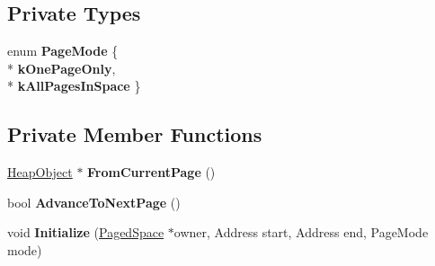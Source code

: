 \subsection*{Private Types}
\begin{DoxyCompactItemize}
\item 
enum {\bfseries Page\+Mode} \{ \\*
{\bfseries k\+One\+Page\+Only}, 
\\*
{\bfseries k\+All\+Pages\+In\+Space}
 \}\hypertarget{classv8_1_1internal_1_1_heap_object_iterator_a4c6710a31770d1d3b01ef1faaac5e553}{}\label{classv8_1_1internal_1_1_heap_object_iterator_a4c6710a31770d1d3b01ef1faaac5e553}

\end{DoxyCompactItemize}
\subsection*{Private Member Functions}
\begin{DoxyCompactItemize}
\item 
\hyperlink{classv8_1_1internal_1_1_heap_object}{Heap\+Object} $\ast$ {\bfseries From\+Current\+Page} ()\hypertarget{classv8_1_1internal_1_1_heap_object_iterator_a3327636c673b36f2c09bec975f61a9d4}{}\label{classv8_1_1internal_1_1_heap_object_iterator_a3327636c673b36f2c09bec975f61a9d4}

\item 
bool {\bfseries Advance\+To\+Next\+Page} ()\hypertarget{classv8_1_1internal_1_1_heap_object_iterator_a0cb20d29988b5aa46d8641b2fbfa0d49}{}\label{classv8_1_1internal_1_1_heap_object_iterator_a0cb20d29988b5aa46d8641b2fbfa0d49}

\item 
void {\bfseries Initialize} (\hyperlink{classv8_1_1internal_1_1_paged_space}{Paged\+Space} $\ast$owner, Address start, Address end, Page\+Mode mode)\hypertarget{classv8_1_1internal_1_1_heap_object_iterator_a77e6b611382377ec18535dca909b4dc1}{}\label{classv8_1_1internal_1_1_heap_object_iterator_a77e6b611382377ec18535dca909b4dc1}

\end{DoxyCompactItemize}
